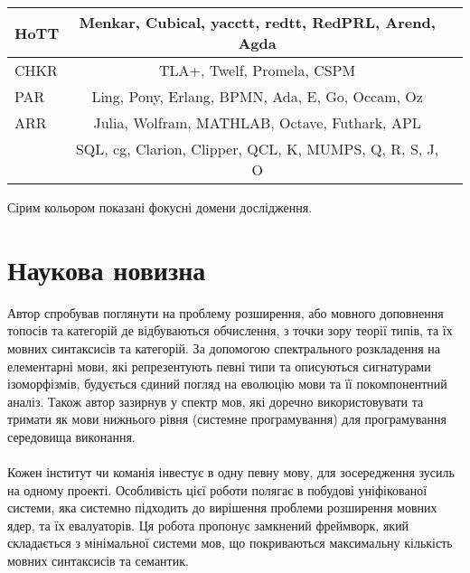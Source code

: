 \begin{table}
\begin{tabular}{lcc}
    \hline
\rowcolor{LightGray}
       HoTT & Menkar, Cubical, yacctt, redtt, RedPRL, Arend, Agda \\
    \hline
\rowcolor{LightGray25}
       CHKR & TLA+, Twelf, Promela, CSPM \\
    \hline
\rowcolor{LightGray}
       PAR & Ling, Pony, Erlang, BPMN, Ada, E, Go, Occam, Oz \\
    \hline
\rowcolor{LightGray}
       ARR & Julia, Wolfram, MATHLAB, Octave, Futhark, APL \\
\rowcolor{LightGray}
           & SQL, cg, Clarion, Clipper, QCL, K, MUMPS, Q, R, S, J, O \\
    \hline
  \end{tabular}
\small Сірим кольором показані фокусні домени дослідження.
\end{table}



\section{Наукова новизна}
Автор спробував поглянути на проблему розширення, або мовного доповнення
топосів та категорій де відбуваються обчислення, з точки зору теорії типів,
та їх мовних синтаксисів та категорій. За допомогою спектрального розкладення на
елементарні мови, які репрезентують певні типи та описуються сигнатурами ізоморфізмів,
будується єдиний погляд на еволюцію мови та її покомпонентний аналіз. Також автор
зазирнув у спектр мов, які доречно використовувати та тримати як мови нижнього
рівня (системне програмування) для програмування середовища виконання.

\paragraph{}
Кожен інститут чи команія інвестує в одну певну мову, для зосередження зусиль на одному проекті.
Особливість цієї роботи полягає в побудові уніфікованої системи, яка системно підходить
до вирішення проблеми розширення мовних ядер, та їх евалуаторів. Ця робота
пропонує замкнений фреймворк, який складається з мінімальної системи мов,
що покриваються максимальну кількість мовних синтаксисів та семантик.

